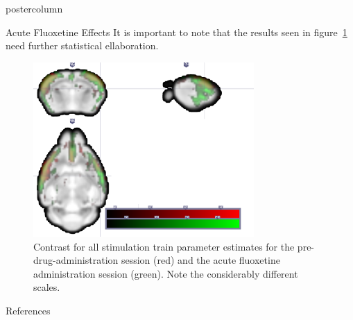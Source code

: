 \documentclass{beamer}
\begin{document}
\begin{frame}
\begin{columns}
\begin{column}{.57\textwidth}
\begin{beamercolorbox}[center]{postercolumn}
\begin{minipage}{.98\textwidth}
{\begin{myblock}{Acute Fluoxetine Effects}
						It is important to note that the results seen in figure~\ref{fig:fail} need further statistical ellaboration.
						\begin{figure}
							\begin{minipage}{0.85\textwidth}
								\centering\includegraphics[width=0.75\textwidth]{img/fail.png}
								\caption{Contrast for all stimulation train parameter estimates for the pre-drug-administration session (red) and the acute fluoxetine administration session (green). Note the considerably different scales.}
								\label{fig:fail}
							\end{minipage}
						\end{figure}
					\end{myblock}\vfill
					\begin{myblock}{References}
						\footnotesize
						
						
					\end{myblock}\vfill
		}\end{minipage}\end{beamercolorbox}
	\end{column}
\end{columns}
\end{frame}
\end{document}
